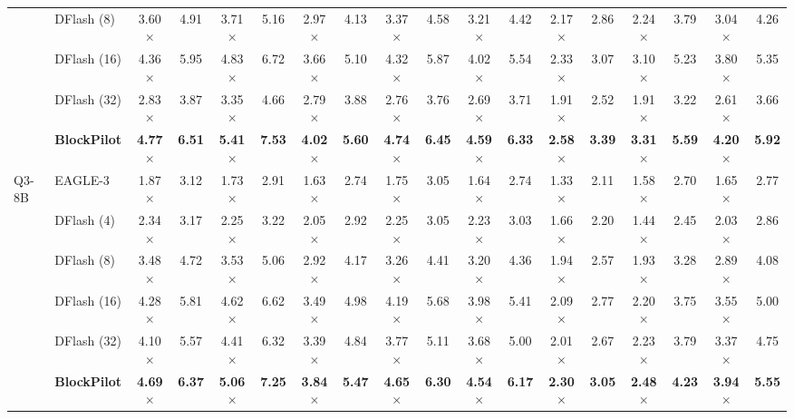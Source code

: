 \documentclass{article}
\begin{document}
\begin{table}[t]
{\begin{tabular}{@{}ll*{8}{cc}@{}}
& DFlash (8)  & 3.60$\times$ & 4.91 & 3.71$\times$ & 5.16 & 2.97$\times$ & 4.13 & 3.37$\times$ & 4.58 & 3.21$\times$ & 4.42 & 2.17$\times$ & 2.86 & 2.24$\times$ & 3.79 & 3.04$\times$ & 4.26 \\
& DFlash (16) & 4.36$\times$ & 5.95 & 4.83$\times$ & 6.72 & 3.66$\times$ & 5.10 & 4.32$\times$ & 5.87 & 4.02$\times$ & 5.54 & 2.33$\times$ & 3.07 & 3.10$\times$ & 5.23 & 3.80$\times$ & 5.35 \\
& DFlash (32) & 2.83$\times$ & 3.87 & 3.35$\times$ & 4.66 & 2.79$\times$ & 3.88 & 2.76$\times$ & 3.76 & 2.69$\times$ & 3.71 & 1.91$\times$ & 2.52 & 1.91$\times$ & 3.22 & 2.61$\times$ & 3.66 \\
& \textbf{BlockPilot} & \textbf{4.77$\times$} & \textbf{6.51} & \textbf{5.41$\times$} & \textbf{7.53} & \textbf{4.02$\times$} & \textbf{5.60} & \textbf{4.74$\times$} & \textbf{6.45} & \textbf{4.59$\times$} & \textbf{6.33} & \textbf{2.58$\times$} & \textbf{3.39} & \textbf{3.31$\times$} & \textbf{5.59} & \textbf{4.20$\times$} & \textbf{5.92} \\
\midrule
\multirow{6}{*}{Q3-8B}
& EAGLE-3     & 1.87$\times$ & 3.12 & 1.73$\times$ & 2.91 & 1.63$\times$ & 2.74 & 1.75$\times$ & 3.05 & 1.64$\times$ & 2.74 & 1.33$\times$ & 2.11 & 1.58$\times$ & 2.70 & 1.65$\times$ & 2.77 \\
& DFlash (4)  & 2.34$\times$ & 3.17 & 2.25$\times$ & 3.22 & 2.05$\times$ & 2.92 & 2.25$\times$ & 3.05 & 2.23$\times$ & 3.03 & 1.66$\times$ & 2.20 & 1.44$\times$ & 2.45 & 2.03$\times$ & 2.86 \\
& DFlash (8)  & 3.48$\times$ & 4.72 & 3.53$\times$ & 5.06 & 2.92$\times$ & 4.17 & 3.26$\times$ & 4.41 & 3.20$\times$ & 4.36 & 1.94$\times$ & 2.57 & 1.93$\times$ & 3.28 & 2.89$\times$ & 4.08 \\
& DFlash (16) & 4.28$\times$ & 5.81 & 4.62$\times$ & 6.62 & 3.49$\times$ & 4.98 & 4.19$\times$ & 5.68 & 3.98$\times$ & 5.41 & 2.09$\times$ & 2.77 & 2.20$\times$ & 3.75 & 3.55$\times$ & 5.00 \\
& DFlash (32) & 4.10$\times$ & 5.57 & 4.41$\times$ & 6.32 & 3.39$\times$ & 4.84 & 3.77$\times$ & 5.11 & 3.68$\times$ & 5.00 & 2.01$\times$ & 2.67 & 2.23$\times$ & 3.79 & 3.37$\times$ & 4.75 \\
& \textbf{BlockPilot} & \textbf{4.69$\times$} & \textbf{6.37} & \textbf{5.06$\times$} & \textbf{7.25} & \textbf{3.84$\times$} & \textbf{5.47} & \textbf{4.65$\times$} & \textbf{6.30} & \textbf{4.54$\times$} & \textbf{6.17} & \textbf{2.30$\times$} & \textbf{3.05} & \textbf{2.48$\times$} & \textbf{4.23} & \textbf{3.94$\times$} & \textbf{5.55} \\
\bottomrule
\end{tabular}%
}
\end{table}
\end{document}
